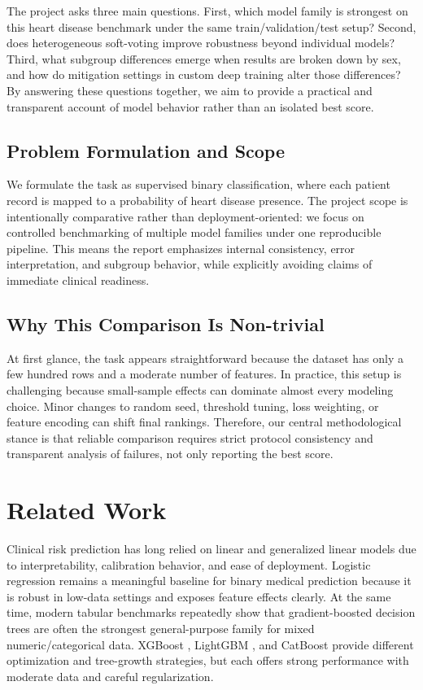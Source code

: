﻿\documentclass[11pt]{article}
\begin{document}
The project asks three main questions. First, which model family is strongest on this heart disease benchmark under the same train/validation/test setup? Second, does heterogeneous soft-voting improve robustness beyond individual models? Third, what subgroup differences emerge when results are broken down by sex, and how do mitigation settings in custom deep training alter those differences? By answering these questions together, we aim to provide a practical and transparent account of model behavior rather than an isolated best score.

\subsection{Problem Formulation and Scope}
We formulate the task as supervised binary classification, where each patient record is mapped to a probability of heart disease presence. The project scope is intentionally comparative rather than deployment-oriented: we focus on controlled benchmarking of multiple model families under one reproducible pipeline. This means the report emphasizes internal consistency, error interpretation, and subgroup behavior, while explicitly avoiding claims of immediate clinical readiness.

\subsection{Why This Comparison Is Non-trivial}
At first glance, the task appears straightforward because the dataset has only a few hundred rows and a moderate number of features. In practice, this setup is challenging because small-sample effects can dominate almost every modeling choice. Minor changes to random seed, threshold tuning, loss weighting, or feature encoding can shift final rankings. Therefore, our central methodological stance is that reliable comparison requires strict protocol consistency and transparent analysis of failures, not only reporting the best score.

\section{Related Work}
Clinical risk prediction has long relied on linear and generalized linear models due to interpretability, calibration behavior, and ease of deployment. Logistic regression remains a meaningful baseline for binary medical prediction because it is robust in low-data settings and exposes feature effects clearly. At the same time, modern tabular benchmarks repeatedly show that gradient-boosted decision trees are often the strongest general-purpose family for mixed numeric/categorical data. XGBoost \cite{chen2016xgboost}, LightGBM \cite{ke2017lightgbm}, and CatBoost \cite{prokhorenkova2018catboost} provide different optimization and tree-growth strategies, but each offers strong performance with moderate data and careful regularization.
\end{document}
